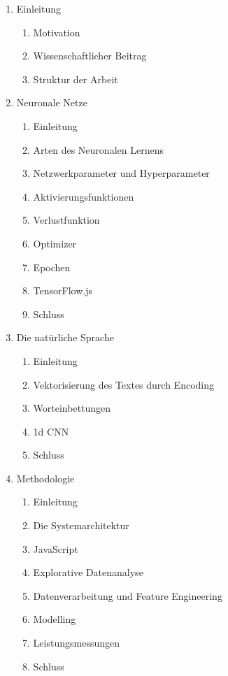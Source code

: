 \begin{enumerate}

  \item Einleitung
  \begin{enumerate}
    \item Motivation
    \item Wissenschaftlicher Beitrag
    \item Struktur der Arbeit
  \end{enumerate}

  \item Neuronale Netze
  \begin{enumerate}
    \item Einleitung
    \item Arten des Neuronalen Lernens
    \item Netzwerkparameter und Hyperparameter
    \item Aktivierungsfunktionen
    \item Verlustfunktion
    \item Optimizer
    \item Epochen
    \item TensorFlow.js
    \item Schluss
  \end{enumerate}

  \item Die natürliche Sprache
  \begin{enumerate}
    \item Einleitung
    \item Vektorisierung des Textes durch Encoding
    \item Worteinbettungen
    \item 1d CNN
    \item Schluss
  \end{enumerate}

  \item Methodologie
  \begin{enumerate}
    \item Einleitung
    \item Die Systemarchitektur
    \item JavaScript
    \item Explorative Datenanalyse
    \item Datenverarbeitung und Feature Engineering
    \item Modelling
    \item Leistungsmessungen
    \item Schluss
  \end{enumerate}


\end{enumerate}
